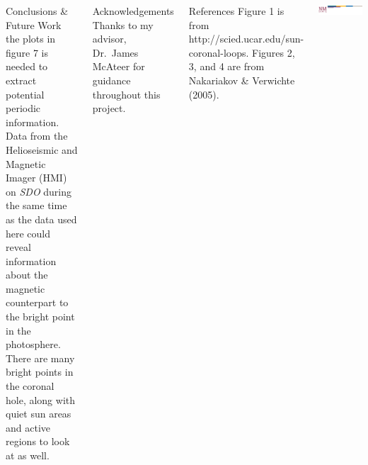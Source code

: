 \documentclass[t]{beamer}
\begin{document}
\begin{frame}[t]
\begin{block}{}
\begin{columns}
\begin{columns}
\begin{block}{Conclusions \& Future Work}
                the plots in \textcolor{myred}{figure 7} is needed to
                extract potential periodic information.
                Data from the Helioseismic and Magnetic Imager (HMI)
                on \emph{SDO} during the
                same time as the data used here could reveal information about
                the magnetic counterpart to the bright point in the photosphere.
                There are many bright points in the coronal hole, along with
                quiet sun areas and active regions to look at as well.
            \end{block}
            \begin{block}{Acknowledgements}
                Thanks to my advisor, Dr.\ James McAteer for guidance throughout
                this project.
            \end{block}
            \begin{block}{References}
                Figure 1 is from \textcolor{myblue}{http://scied.ucar.edu/sun-coronal-loops}.
                Figures 2, 3, and 4 are from Nakariakov \& Verwichte (2005).
            \end{block}
        \end{columns}
        \par\vspace{3cm}
        \includegraphics{nmsu.png}
    \end{columns}
\end{block}
\end{frame}
\end{document}
